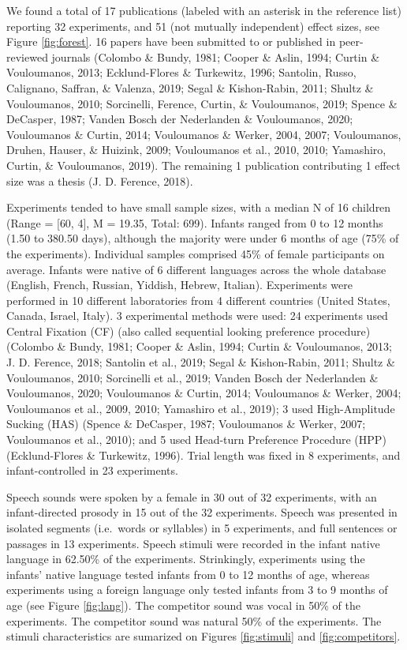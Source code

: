 \documentclass[man]{apa6}
\begin{document}
We found a total of 17 publications (labeled with an asterisk in the
reference list) reporting 32 experiments, and 51 (not mutually
independent) effect sizes, see Figure \ref{fig:forest}. 16 papers have
been submitted to or published in peer-reviewed journals (Colombo \&
Bundy, 1981; Cooper \& Aslin, 1994; Curtin \& Vouloumanos, 2013;
Ecklund-Flores \& Turkewitz, 1996; Santolin, Russo, Calignano, Saffran,
\& Valenza, 2019; Segal \& Kishon-Rabin, 2011; Shultz \& Vouloumanos,
2010; Sorcinelli, Ference, Curtin, \& Vouloumanos, 2019; Spence \&
DeCasper, 1987; Vanden Bosch der Nederlanden \& Vouloumanos, 2020;
Vouloumanos \& Curtin, 2014; Vouloumanos \& Werker, 2004, 2007;
Vouloumanos, Druhen, Hauser, \& Huizink, 2009; Vouloumanos et al., 2010,
2010; Yamashiro, Curtin, \& Vouloumanos, 2019). The remaining 1
publication contributing 1 effect size was a thesis (J. D. Ference,
2018).

Experiments tended to have small sample sizes, with a median N of 16
children (Range = {[}60, 4{]}, M = 19.35, Total: 699). Infants ranged
from 0 to 12 months (1.50 to 380.50 days), although the majority were
under 6 months of age (75\% of the experiments). Individual samples
comprised 45\% of female participants on average. Infants were native of
6 different languages across the whole database (English, French,
Russian, Yiddish, Hebrew, Italian). Experiments were performed in 10
different laboratories from 4 different countries (United States,
Canada, Israel, Italy). 3 experimental methods were used: 24 experiments
used Central Fixation (CF) (also called sequential looking preference
procedure) (Colombo \& Bundy, 1981; Cooper \& Aslin, 1994; Curtin \&
Vouloumanos, 2013; J. D. Ference, 2018; Santolin et al., 2019; Segal \&
Kishon-Rabin, 2011; Shultz \& Vouloumanos, 2010; Sorcinelli et al.,
2019; Vanden Bosch der Nederlanden \& Vouloumanos, 2020; Vouloumanos \&
Curtin, 2014; Vouloumanos \& Werker, 2004; Vouloumanos et al., 2009,
2010; Yamashiro et al., 2019); 3 used High-Amplitude Sucking (HAS)
(Spence \& DeCasper, 1987; Vouloumanos \& Werker, 2007; Vouloumanos et
al., 2010); and 5 used Head-turn Preference Procedure (HPP)
(Ecklund-Flores \& Turkewitz, 1996). Trial length was fixed in 8
experiments, and infant-controlled in 23 experiments.

Speech sounds were spoken by a female in 30 out of 32 experiments, with
an infant-directed prosody in 15 out of the 32 experiments. Speech was
presented in isolated segments (i.e.~words or syllables) in 5
experiments, and full sentences or passages in 13 experiments. Speech
stimuli were recorded in the infant native language in 62.50\% of the
experiments. Strinkingly, experiments using the infants' native language
tested infants from 0 to 12 months of age, whereas experiments using a
foreign language only tested infants from 3 to 9 months of age (see
Figure \ref{fig:lang}). The competitor sound was vocal in 50\% of the
experiments. The competitor sound was natural 50\% of the experiments.
The stimuli characteristics are sumarized on Figures \ref{fig:stimuli}
and \ref{fig:competitors}.
\end{document}

